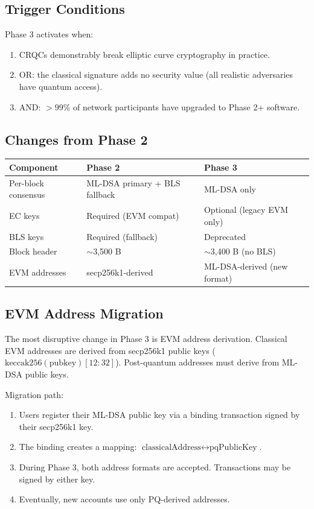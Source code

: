 \documentclass[11pt,a4paper]{article}
\begin{document}
\subsection{Trigger Conditions}

Phase 3 activates when:
\begin{enumerate}[leftmargin=2em]
\item CRQCs demonstrably break elliptic curve cryptography in practice.
\item OR: the classical signature adds no security value (all realistic adversaries have quantum access).
\item AND: $>$99\% of network participants have upgraded to Phase 2+ software.
\end{enumerate}

\subsection{Changes from Phase 2}

\begin{center}
\begin{tabular}{lll}
\toprule
\textbf{Component} & \textbf{Phase 2} & \textbf{Phase 3} \\
\midrule
Per-block consensus & ML-DSA primary + BLS fallback & ML-DSA only \\
EC keys & Required (EVM compat) & Optional (legacy EVM only) \\
BLS keys & Required (fallback) & Deprecated \\
Block header & $\sim$3,500 B & $\sim$3,400 B (no BLS) \\
EVM addresses & secp256k1-derived & ML-DSA-derived (new format) \\
\bottomrule
\end{tabular}
\end{center}

\subsection{EVM Address Migration}

The most disruptive change in Phase 3 is EVM address derivation. Classical EVM addresses are derived from secp256k1 public keys ($\text{keccak256}(\text{pubkey})[12:32]$). Post-quantum addresses must derive from ML-DSA public keys.

Migration path:
\begin{enumerate}[leftmargin=2em]
\item Users register their ML-DSA public key via a binding transaction signed by their secp256k1 key.
\item The binding creates a mapping: $\text{classicalAddress} \leftrightarrow \text{pqPublicKey}$.
\item During Phase 3, both address formats are accepted. Transactions may be signed by either key.
\item Eventually, new accounts use only PQ-derived addresses.
\end{enumerate}
\end{document}
